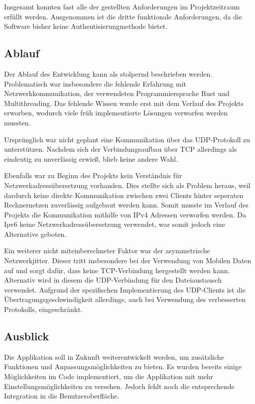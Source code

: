 Insgesamt konnten fast alle der gestellten Anforderungen im Projektzeitraum erfüllt werden. Ausgenommen ist die dritte funktionale Anforderungen, da die Software bisher keine Authentisierungmethode bietet.

\subsection{Ablauf}
Der Ablauf des Entwicklung kann als stolpernd beschrieben werden. Problematisch war insbesondere die fehlende Erfahrung mit Netzwerkkommunikation, der verwendeten Programmiersprache Rust und Multithreading. Das fehlende Wissen wurde erst mit dem Verlauf des Projekts erworben, wodurch viele früh implementierte Lösungen verworfen werden mussten.

Ursprünglich war nicht geplant eine Kommunikation über das UDP-Protokoll zu unterstützen. Nachdem sich der Verbindungsaufbau über TCP allerdings als eindeutig zu unverlässig erwieß, blieb keine andere Wahl.

Ebenfalls war zu Beginn des Projekts kein Verständnis für Netzwerkadressübersetzung vorhanden. Dies stellte sich als Problem heraus, weil dardurch keine direkte Kommunikation zwischen zwei Clients hinter seperaten Rechnernetzen zuverlässig aufgebaut werden kann. Somit musste im Verlauf des Projekts die Kommunikation mithilfe von IPv4 Adressen verworfen werden. Da Ipv6 keine Netzwerkadressübersetzung verwendet, war somit jedoch eine Alternative geboten.

Ein weiterer nicht miteinberechneter Faktor war der asymmetrische Netzwerkjitter. Dieser tritt insbesondere bei der Verwendung von Mobilen Daten auf und sorgt dafür, dass keine TCP-Verbindung hergestellt werden kann. Alternativ wird in diesem die UDP-Verbindung für den Dateiaustausch verwendet. Aufgrund der spezifischen Implementierung des UDP-Clients ist die Übertragungsgeschwindigkeit allerdings, auch bei Verwendung des verbesserten Protokolls, eingeschränkt.

\subsection{Ausblick}
Die Applikation soll in Zukunft weiterentwickelt werden, um zusätzliche Funktionen und Anpassungsmöglichkeiten zu bieten.
Es wurden bereits einige Möglichkeiten im Code implementiert, um die Applikation mit mehr Einstellungsmöglichkeiten zu versehen. Jedoch fehlt noch die entsprechende Integration in die Benutzeroberfläche.

